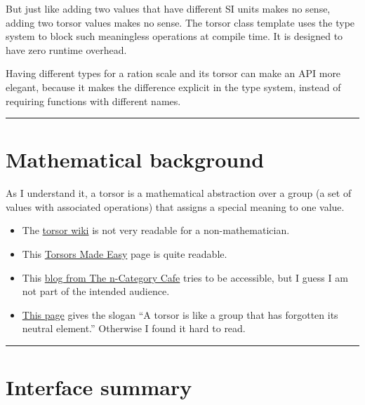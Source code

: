 \documentclass[]{article}
\begin{document}
But just like adding two values that have different SI units makes no
sense, adding two torsor values makes no sense. The torsor class
template uses the type system to block such meaningless operations at
compile time. It is designed to have zero runtime overhead.

Having different types for a ration scale and its torsor can make an API
more elegant, because it makes the difference explicit in the type
system, instead of requiring functions with different names.

\begin{center}\rule{0.5\linewidth}{\linethickness}\end{center}

\hypertarget{mathematical-background}{%
\section{Mathematical background}\label{mathematical-background}}

As I understand it, a torsor is a mathematical abstraction over a group
(a set of values with associated operations) that assigns a special
meaning to one value.

\begin{itemize}
\item
  The
  \href{https://en.wikipedia.org/wiki/Torsor_(algebraic_geometry)}{torsor
  wiki} is not very readable for a non-mathematician.
\item
  This \href{http://math.ucr.edu/home/baez/torsors.html}{Torsors Made
  Easy} page is quite readable.
\item
  This
  \href{https://golem.ph.utexas.edu/category/2013/06/torsors_and_enriched_categorie.html}{blog
  from The n-Category Cafe} tries to be accessible, but I guess I am not
  part of the intended audience.
\item
  \href{https://ncatlab.org/nlab/show/torsor}{This page} gives the
  slogan ``A torsor is like a group that has forgotten its neutral
  element.'' Otherwise I found it hard to read.
\end{itemize}

\begin{center}\rule{0.5\linewidth}{\linethickness}\end{center}

\hypertarget{interface-summary}{%
\section{Interface summary}\label{interface-summary}}
\end{document}
